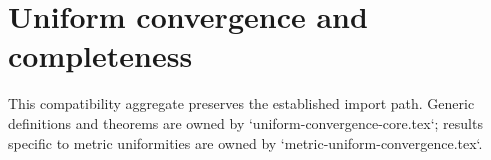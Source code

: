 \section{Uniform convergence and completeness}




This compatibility aggregate preserves the established import path.  Generic
definitions and theorems are owned by `uniform-convergence-core.tex`; results
specific to metric uniformities are owned by
`metric-uniform-convergence.tex`.
